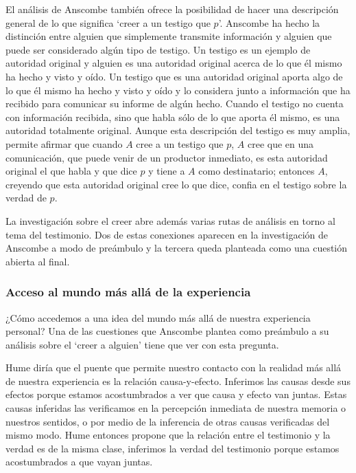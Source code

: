 El análisis de Anscombe también ofrece la posibilidad de hacer una descripción
general de lo que significa `creer a un testigo que $p$'. Anscombe ha hecho la
distinción entre alguien que simplemente transmite información y alguien que
puede ser considerado algún tipo de testigo. Un testigo es un ejemplo de
autoridad original y alguien es una autoridad original acerca de lo que él mismo
ha hecho y visto y oído. Un testigo que es una autoridad original aporta algo de
lo que él mismo ha hecho y visto y oído y lo considera junto a información que
ha recibido para comunicar su informe de algún hecho. Cuando el testigo no
cuenta con información recibida, sino que habla sólo de lo que aporta él mismo,
es una autoridad totalmente original. Aunque esta descripción del testigo es muy
amplia, permite afirmar que cuando $A$ cree a un testigo que $p$, $A$ cree que
en una comunicación, que puede venir de un productor inmediato, es esta
autoridad original el que habla y que dice $p$ y tiene a $A$ como destinatario;
entonces $A$, creyendo que esta autoridad original cree lo que dice, confia en
el testigo sobre la verdad de $p$.

La investigación sobre el creer abre además varias rutas de análisis en torno al
tema del testimonio. Dos de estas conexiones aparecen en la investigación de
Anscombe a modo de preámbulo y la tercera queda planteada como una cuestión
abierta al final.

\subsubsection{Acceso al mundo más allá de la experiencia}
¿Cómo accedemos a una idea del mundo más allá de nuestra experiencia personal?
Una de las cuestiones que Anscombe plantea como preámbulo a su análisis sobre el
`creer a alguien' tiene que ver con esta pregunta.

Hume diría que el puente que permite nuestro contacto con la realidad más allá
de nuestra experiencia es la relación
causa-y-efecto\autocite[Cf.~][3]{anscombe2008faith:tobelieve}. Inferimos las
causas desde sus efectos porque estamos acostumbrados a ver que causa y efecto
van juntas. Estas causas inferidas las verificamos en la percepción inmediata de
nuestra memoria o nuestros sentidos, o por medio de la inferencia de otras
causas verificadas del mismo
modo\autocite[Cf.~][88]{anscombe1981parmenides:humeandjulius}. Hume entonces
propone que la relación entre el testimonio y la verdad es de la misma clase,
inferimos la verdad del testimonio porque estamos acostumbrados a que vayan
juntas\autocite[Cf.~][3]{anscombe2008faith:tobelieve}.


